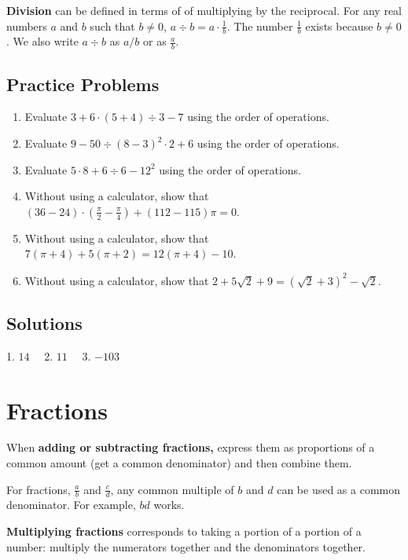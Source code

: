 \documentclass[11pt]{book}               %
\begin{document}
\textbf{Division} can be defined in terms of of multiplying by the reciprocal.
For any real numbers $a$ and $b$ such that $b \neq 0$,  $a \div b=a \cdot \frac{1}{b}$.
The number $\frac{1}{b}$ exists because $b \neq 0$.
We also write $a \div b$ as $a / b$ or as $\frac{a}{b}$.

\subsection{Practice Problems}

\begin{enumerate}
    \item Evaluate $3 + 6 \cdot (5 + 4) \div 3 - 7$ using the order of operations. %
    \item Evaluate $9 - 50 \div (8 - 3)^2 \cdot 2 + 6$ using the order of operations. %
    \item Evaluate $5 \cdot 8 + 6 \div 6 - 12 ^ 2$  using the order of operations. %
    \item Without using a calculator, show that $(36-24)\cdot\left(\frac{\pi}{2} -\frac{\pi}{4}\right) + (112 - 115)\pi = 0$.
    \item Without using a calculator, show that $7\left(\pi+4\right) + 5\left(\pi+2\right)=12\left(\pi+4\right)-10$.
    \item Without using a calculator, show that $2+5\sqrt{2}+9=\left(\sqrt{2}+3\right)^2-\sqrt{2}$.
\end{enumerate}

\subsection{Solutions}

1.  $14 \quad$ 2. $11 \quad$ 3.  $-103$

\newpage
\section{Fractions}
When {\bf adding or subtracting fractions,} express them as proportions of a common amount (get a common denominator) and then combine them.

For fractions, $\frac{a}{b}$ and $\frac{c}{d}$, any common multiple of $b$ and $d$ can be used as a common denominator. For example, $bd$ works. 


 {\bf Multiplying fractions} corresponds to taking a portion of a portion of a number:  multiply the numerators together and the denominators together. 
\end{document}
